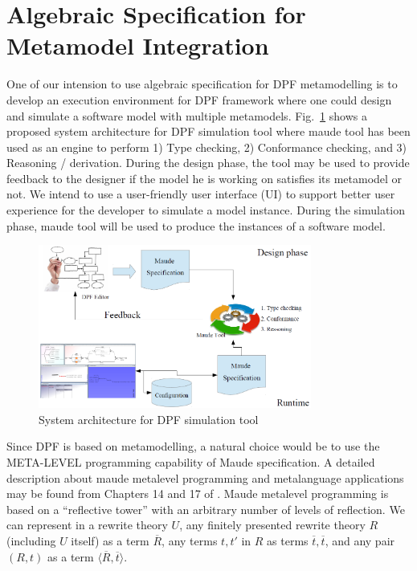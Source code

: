 \documentclass{eceasst}
\begin{document}
 
\section{Algebraic Specification for Metamodel Integration}\label{lbl:algebra}
One of our intension to use algebraic specification for DPF metamodelling is to develop an execution environment for DPF framework where one could design and simulate a software model with 
multiple metamodels. Fig.~\ref{fig:dpfmaude} shows a proposed system architecture for DPF simulation tool where maude tool has been used as an engine to perform 1) Type checking, 2) Conformance checking,
and 3) Reasoning / derivation. During the design phase, the tool may be used to provide feedback to the designer if the model he is working on satisfies its metamodel or not. 
We intend to use a user-friendly user interface (UI) to support better user experience for the developer to simulate a model instance. 
During the simulation phase, maude tool will be used to produce the instances of a software model. 



 
 \begin{figure}[h]
\centering
 \includegraphics[width=0.8\textwidth]{dpfmaude.png}
 \caption{System architecture for DPF simulation tool}
 \label{fig:dpfmaude}
 \end{figure}

Since DPF is based on metamodelling, a natural choice would be to use the META-LEVEL programming capability of Maude specification. 
A detailed description about maude metalevel programming and metalanguage applications may be found from Chapters 14 and 17 of \cite{Clavel2007}. 
Maude metalevel programming is based on a ``reflective tower'' with an arbitrary number of levels of reflection. 
We can represent in a rewrite theory $U$, any finitely presented rewrite theory $R$ (including $U$ itself) as a term $\overline{R}$, any terms $t, t'$ in $R$ as terms $\overline{t}, \overline{t}$, 
and any pair $(R, t)$ as a term $\langle \overline{R}, \overline{t} \rangle$. 
\end{document}
